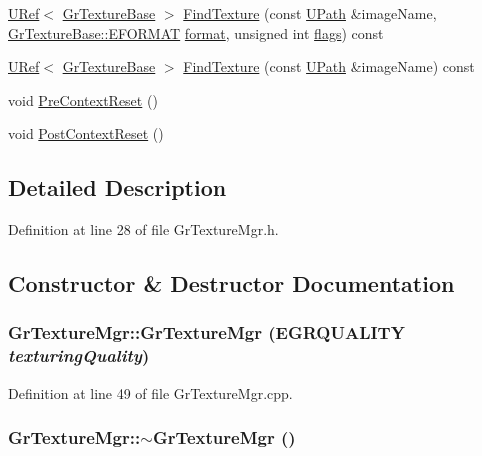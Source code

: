 \begin{CompactItemize}
\item 
\hyperlink{class_u_ref}{URef}$<$ \hyperlink{class_gr_texture_base}{GrTextureBase} $>$ \hyperlink{class_gr_texture_mgr_83321c109ae9862b3e9ad6acabd8819d}{FindTexture} (const \hyperlink{class_u_path}{UPath} \&imageName, \hyperlink{class_gr_texture_base_82c606022e93566ba55fe4cd3beb687c}{GrTextureBase::EFORMAT} \hyperlink{glext__bak_8h_e2d3db041c6004a67047659b42f73a44}{format}, unsigned int \hyperlink{_u_t_message_8h_0a3c0b351ab09281b662a9ff4f900a53}{flags}) const 
\item 
\hyperlink{class_u_ref}{URef}$<$ \hyperlink{class_gr_texture_base}{GrTextureBase} $>$ \hyperlink{class_gr_texture_mgr_a70c68e3de9b73044851ffebb35d4cba}{FindTexture} (const \hyperlink{class_u_path}{UPath} \&imageName) const 
\item 
void \hyperlink{class_gr_texture_mgr_c03dca06b6577638a465efba18b89502}{PreContextReset} ()
\item 
void \hyperlink{class_gr_texture_mgr_d6946717cc8105c67252c3cbd6dc7c14}{PostContextReset} ()
\end{CompactItemize}


\subsection{Detailed Description}


Definition at line 28 of file GrTextureMgr.h.

\subsection{Constructor \& Destructor Documentation}
\hypertarget{class_gr_texture_mgr_e876dc2f946618034891e7d0481859c7}{
\subsubsection[{GrTextureMgr}]{\setlength{\rightskip}{0pt plus 5cm}GrTextureMgr::GrTextureMgr ({\bf EGRQUALITY} {\em texturingQuality})}}
\label{class_gr_texture_mgr_e876dc2f946618034891e7d0481859c7}




Definition at line 49 of file GrTextureMgr.cpp.\hypertarget{class_gr_texture_mgr_f3605c16cc8ce7bcff1d83e199eb1740}{
\subsubsection[{$\sim$GrTextureMgr}]{\setlength{\rightskip}{0pt plus 5cm}GrTextureMgr::$\sim$GrTextureMgr ()}}
\label{class_gr_texture_mgr_f3605c16cc8ce7bcff1d83e199eb1740}





